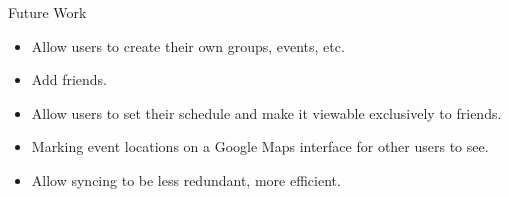 \documentclass{beamer}
\begin{document}
\begin{frame}{Future Work}
\begin{itemize}
\item Allow users to create their own groups, events, etc.
\item Add friends.
\item Allow users to set their schedule and make it viewable exclusively to friends.
\item Marking event locations on a Google Maps interface for other users to see. 
\item Allow syncing to be less redundant, more efficient.
\end{itemize}
\end{frame}

%
\end{document}
